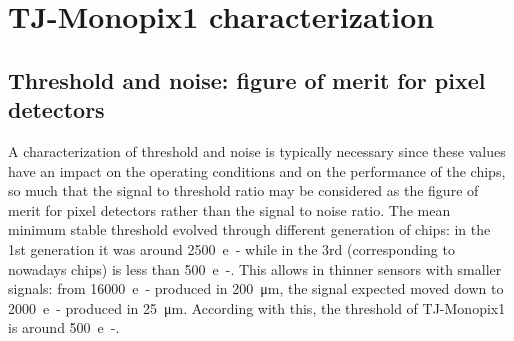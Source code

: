 
\section{TJ-Monopix1 characterization}
    \subsection{Threshold and noise: figure of merit for pixel detectors}
        A characterization of threshold and noise is typically necessary since these values have an impact on the operating conditions and on the performance of the chips, so much that the signal to threshold ratio may be considered as the figure of merit for pixel detectors rather than the signal to noise ratio.
        The mean minimum stable threshold evolved through different generation of chips: in the 1st generation it was around \SI{2500}{e-} while in the 3rd (corresponding to nowadays chips) is less than \SI{500}{e-}. This allows in thinner sensors with smaller signals: from \SI{16000}{e-} produced in \SI{200}{\um}, the signal expected moved down to \SI{2000}{e-} produced in \SI{25}{\um}. According with this, the threshold of TJ-Monopix1 is around \SI{500}{e-}.
 
